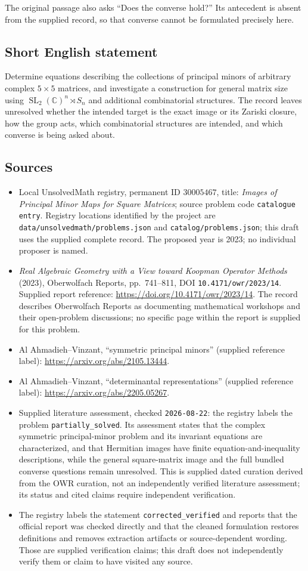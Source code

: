 \documentclass[11pt]{article}
\newcommand{\C}{\mathbb{C}}
\begin{document}
The original passage also asks ``Does the converse hold?'' Its antecedent is absent from the supplied record, so that converse cannot be formulated precisely here.
\subsection{Short English statement}
Determine equations describing the collections of principal minors of arbitrary complex \(5\times5\) matrices, and investigate a construction for general matrix size using \(\operatorname{SL}_2(\C)^n\rtimes S_n\) and additional combinatorial structures. The record leaves unresolved whether the intended target is the exact image or its Zariski closure, how the group acts, which combinatorial structures are intended, and which converse is being asked about.
\subsection{Sources}
\begin{itemize}
\item Local UnsolvedMath registry, permanent ID \(30005467\), title: \emph{Images of Principal Minor Maps for Square Matrices}; source problem code \texttt{catalogue entry}. Registry locations identified by the project are \texttt{data/unsolvedmath/problems.json} and \texttt{catalog/problems.json}; this draft uses the supplied complete record. The proposed year is 2023; no individual proposer is named.
\item \emph{Real Algebraic Geometry with a View toward Koopman Operator Methods} (2023), Oberwolfach Reports, pp.\ 741--811, DOI \texttt{10.4171/owr/2023/14}. Supplied report reference: \url{https://doi.org/10.4171/owr/2023/14}. The record describes Oberwolfach Reports as documenting mathematical workshops and their open-problem discussions; no specific page within the report is supplied for this problem.
\item Al Ahmadieh--Vinzant, ``symmetric principal minors'' (supplied reference label): \url{https://arxiv.org/abs/2105.13444}.
\item Al Ahmadieh--Vinzant, ``determinantal representations'' (supplied reference label): \url{https://arxiv.org/abs/2205.05267}.
\item Supplied literature assessment, checked \texttt{2026-08-22}: the registry labels the problem \texttt{partially\_solved}. Its assessment states that the complex symmetric principal-minor problem and its invariant equations are characterized, and that Hermitian images have finite equation-and-inequality descriptions, while the general square-matrix image and the full bundled converse questions remain unresolved. This is supplied dated curation derived from the OWR curation, not an independently verified literature assessment; its status and cited claims require independent verification.
\item The registry labels the statement \texttt{corrected\_verified} and reports that the official report was checked directly and that the cleaned formulation restores definitions and removes extraction artifacts or source-dependent wording. Those are supplied verification claims; this draft does not independently verify them or claim to have visited any source.
\end{itemize}
\end{document}
